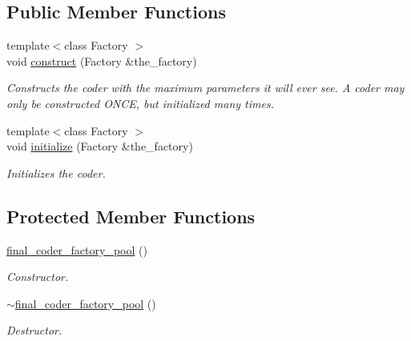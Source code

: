 \subsection*{Public Member Functions}
\begin{DoxyCompactItemize}
\item 
{\footnotesize template$<$class Factory $>$ }\\void \hyperlink{classkodo_1_1final__coder__factory__pool_a3c1b73450aef4335e235b434cc56633b}{construct} (Factory \&the\-\_\-factory)
\begin{DoxyCompactList}\small\item\em Constructs the coder with the maximum parameters it will ever see. A coder may only be constructed O\-N\-C\-E, but initialized many times. \end{DoxyCompactList}\item 
{\footnotesize template$<$class Factory $>$ }\\void \hyperlink{classkodo_1_1final__coder__factory__pool_ac1cbb55a1b94721c7bd49da348cb9cef}{initialize} (Factory \&the\-\_\-factory)
\begin{DoxyCompactList}\small\item\em Initializes the coder. \end{DoxyCompactList}\end{DoxyCompactItemize}
\subsection*{Protected Member Functions}
\begin{DoxyCompactItemize}
\item 
\hypertarget{classkodo_1_1final__coder__factory__pool_a6a8fcbb1725903e30c4fe317d29b4e95}{\hyperlink{classkodo_1_1final__coder__factory__pool_a6a8fcbb1725903e30c4fe317d29b4e95}{final\-\_\-coder\-\_\-factory\-\_\-pool} ()}\label{classkodo_1_1final__coder__factory__pool_a6a8fcbb1725903e30c4fe317d29b4e95}

\begin{DoxyCompactList}\small\item\em Constructor. \end{DoxyCompactList}\item 
\hypertarget{classkodo_1_1final__coder__factory__pool_a219a8dcb104d9371895eafdd760708b3}{\hyperlink{classkodo_1_1final__coder__factory__pool_a219a8dcb104d9371895eafdd760708b3}{$\sim$final\-\_\-coder\-\_\-factory\-\_\-pool} ()}\label{classkodo_1_1final__coder__factory__pool_a219a8dcb104d9371895eafdd760708b3}

\begin{DoxyCompactList}\small\item\em Destructor. \end{DoxyCompactList}\end{DoxyCompactItemize}


